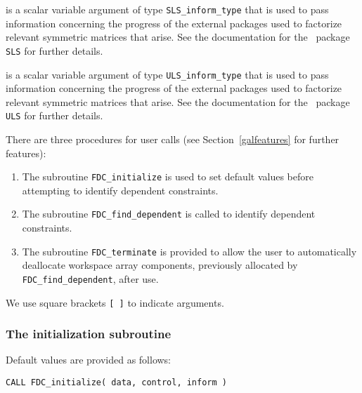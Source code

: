 \documentclass{galahad}
\newcommand{\packagename}{FDC}
\begin{document}
\begin{description}
 is a scalar variable argument of type
{\tt SLS\_inform\_type} that is used to pass information
concerning the progress of the external packages used to
factorize relevant symmetric matrices that arise.
See the documentation for the \galahad\ package {\tt SLS} for further details.

 is a scalar variable argument of type
{\tt ULS\_inform\_type} that is used to pass information
concerning the progress of the external packages used to
factorize relevant symmetric matrices that arise.
See the documentation for the \galahad\ package {\tt ULS} for further details.

\end{description}


\galarguments
There are three procedures for user calls
(see Section~\ref{galfeatures} for further features):

\begin{enumerate}
\item The subroutine
      {\tt \packagename\_initialize}
      is used to set default values
      before attempting to identify dependent constraints.
\item The subroutine
      {\tt \packagename\_find\_dependent}
      is called to identify dependent constraints.
\item The subroutine
      {\tt \packagename\_terminate}
      is provided to allow the user to automatically deallocate
      workspace array components, previously allocated by
       {\tt \packagename\_find\_dependent}, after use.
\end{enumerate}
We use square brackets {\tt [ ]} to indicate \optional arguments.


\subsubsection{The initialization subroutine}\label{subinit}
 Default values are provided as follows:
\vspace*{1mm}

\hspace{8mm}
{\tt CALL \packagename\_initialize(  data, control, inform )}
\end{document}
